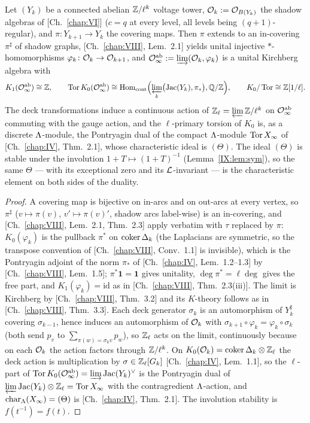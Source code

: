 \begin{theorem}\label{IX:thm:shadow}
Let $(Y_k)$ be a connected abelian $\mathbb{Z}/\ell^{k}$ voltage tower, $\mathcal{O}_k:=\mathcal{O}_{B(Y_k)}$ the
shadow algebras of {\rm[Ch.~\ref{chap:VI}]} ($c=q$ at every level, all levels being $(q{+}1)$-regular),
and $\pi\colon Y_{k+1}\to Y_k$ the covering maps. Then $\pi$ extends to an in-covering
$\pi^{\sharp}$ of shadow graphs, {\rm[Ch.~\ref{chap:VIII}, Lem.~2.1]} yields unital injective
$*$-homomorphisms $\varphi_k\colon\mathcal{O}_k\to\mathcal{O}_{k+1}$, and
$\mathcal{O}_\infty^{\mathrm{ab}}:=\varinjlim(\mathcal{O}_k,\varphi_k)$ is a unital Kirchberg algebra with
\[
K_1(\mathcal{O}_\infty^{\mathrm{ab}})\cong\mathbb{Z},\qquad
\operatorname{Tor} K_0(\mathcal{O}_\infty^{\mathrm{ab}})\cong\operatorname{Hom}_{\mathrm{cont}}\Bigl(\varprojlim_k\bigl(\operatorname{Jac}(Y_k),\pi_*\bigr),\mathbb{Q}/\mathbb{Z}\Bigr),
\qquad K_0/\operatorname{Tor}\cong\mathbb{Z}[1/\ell].
\]
The deck transformations induce a continuous action of $\mathbb{Z}_\ell=\varprojlim\mathbb{Z}/\ell^{k}$ on
$\mathcal{O}_\infty^{\mathrm{ab}}$ commuting with the gauge action, and the $\ell$-primary torsion
of $K_0$ is, as a discrete $\Lambda$-module, the Pontryagin dual of the compact $\Lambda$-module
$\operatorname{Tor} X_\infty$ of {\rm[Ch.~\ref{chap:IV}, Thm.~2.1]}, whose characteristic ideal is $(\Theta)$. The
ideal $(\Theta)$ is stable under the involution $1+T\mapsto(1+T)^{-1}$
(Lemma~\ref{IX:lem:sym}), so the same $\Theta$ --- with its exceptional zero and its
$\mathcal{L}$-invariant --- is the characteristic element on both sides of the duality.
\end{theorem}

\begin{proof}
A covering map is bijective on in-arcs and on out-arcs at every vertex, so
$\pi^{\sharp}$ ($v\mapsto\pi(v)$, $v'\mapsto\pi(v)'$, shadow arcs label-wise) is an
in-covering, and [Ch.~\ref{chap:VIII}, Lem.~2.1, Thm.~2.3] apply verbatim with $\tau$ replaced by
$\pi$: $K_0(\varphi_k)$ is the pullback $\pi^{*}$ on $\operatorname{coker}\Delta_k$ (the Laplacians
are symmetric, so the transpose convention of [Ch.~\ref{chap:VIII}, Conv.~1.1] is invisible), which is
the Pontryagin adjoint of the norm $\pi_*$ of [Ch.~\ref{chap:IV}, Lem.~1.2--1.3] by
[Ch.~\ref{chap:VIII}, Lem.~1.5]; $\pi^{*}\mathbf1=\mathbf1$ gives unitality, $\deg\pi^{*}=\ell\deg$
gives the free part, and $K_1(\varphi_k)=\mathrm{id}$ as in [Ch.~\ref{chap:VIII}, Thm.~2.3(iii)]. The
limit is Kirchberg by [Ch.~\ref{chap:VIII}, Thm.~3.2] and its $K$-theory follows as in
[Ch.~\ref{chap:VIII}, Thm.~3.3]. Each deck generator $\sigma_k$ is an automorphism of $Y_k^{\sharp}$
covering $\sigma_{k-1}$, hence induces an automorphism of $\mathcal{O}_k$ with
$\sigma_{k+1}\circ\varphi_k=\varphi_k\circ\sigma_k$ (both send $p_v$ to
$\sum_{\pi(w)=\sigma_kv}p_w$), so $\mathbb{Z}_\ell$ acts on the limit, continuously because on each
$\mathcal{O}_k$ the action factors through $\mathbb{Z}/\ell^{k}$. On $K_0(\mathcal{O}_k)=\operatorname{coker}\Delta_k\otimes\mathbb{Z}_\ell$
the deck action is multiplication by $\sigma\in\mathbb{Z}_\ell[G_k]$ [Ch.~\ref{chap:IV}, Lem.~1.1], so the
$\ell$-part of $\operatorname{Tor} K_0(\mathcal{O}_\infty^{\mathrm{ab}})=\varinjlim\operatorname{Jac}(Y_k)^{\vee}$ is the
Pontryagin dual of $\varprojlim\operatorname{Jac}(Y_k)\otimes\mathbb{Z}_\ell=\operatorname{Tor} X_\infty$ with the
contragredient $\Lambda$-action, and $\operatorname{char}_{\Lambda}(X_\infty)=(\Theta)$ is [Ch.~\ref{chap:IV}, Thm.~2.1]. The
involution stability is $f(t^{-1})=f(t)$.
\end{proof}

